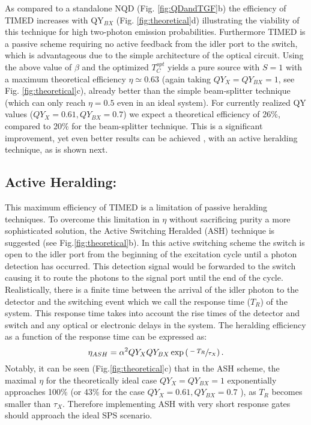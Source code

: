 \documentclass[journal=nalefd,manuscript=letter]{achemso}
\begin{document}
As compared to a standalone NQD (Fig. \ref{fig:QDandTGF}b) the efficiency of TIMED increases with QY$_{BX}$ (Fig. \ref{fig:theoretical}d) illustrating the viability of this technique for high two-photon emission probabilities. 
Furthermore TIMED is a passive scheme requiring no active feedback from the idler port to the switch, which is advantageous due to the simple architecture of the optical circuit. 
Using the above value of $\beta$ and the optimized $T_C^{opt}$ yields a pure source with $S=1$ with a maximum theoretical efficiency $\eta\simeq 0.63$ (again taking $QY_{X}=QY_{BX}=1$, see Fig. \ref{fig:theoretical}c), already better than the simple beam-splitter technique (which can only reach $\eta=0.5$ even in an ideal system).
For currently realized QY values ($QY_X=0.61,QY_{BX}=0.7$) \cite{Matsuzaki2017StrongAntenna} we expect a theoretical efficiency of 26\%, compared to 20\% for the beam-splitter technique. 
This is a significant improvement, yet even better results can be achieved , with an active heralding technique, as is shown next.

\subsection{Active Heralding:}
This maximum efficiency of TIMED is a limitation of passive heralding techniques. To overcome this limitation in $\eta$ without sacrificing purity a more sophisticated solution, the Active Switching Heralded (ASH) technique is suggested (see Fig.\ref{fig:theoretical}b).
In this active switching scheme the switch is open to the idler port from the beginning of the excitation cycle until a photon detection has occurred. 
This detection signal would be forwarded to the switch causing it to route the photons to the signal port until the end of the cycle. 
Realistically, there is a finite time between the arrival of the idler photon to the detector and the switching event which we call the response time ($T_R$) of the system. 
This response time takes into account the rise times of the detector and switch and any optical or electronic delays in the system. 
The heralding efficiency as a function of the response time can be expressed as\cite{supp}:
\begin{equation}
\eta_{ASH}= \alpha^2 QY_X QY_{BX} \exp\left(\sfrac{-T_R}{\tau_X}\right)
\label{eq: etaASH}.
\end{equation}
Notably, it can be seen (Fig.\ref{fig:theoretical}c) that in the ASH scheme, the maximal $\eta$ for the theoretically ideal case $QY_{X}=QY_{BX}=1$ exponentially approaches 100\% (or 43\% for the case $QY_X=0.61,QY_{BX}=0.7$ \cite{Matsuzaki2017StrongAntenna}), as $T_R$ becomes smaller than $\tau_X$. Therefore implementing ASH with very short response gates should approach the ideal SPS scenario.
\end{document}
